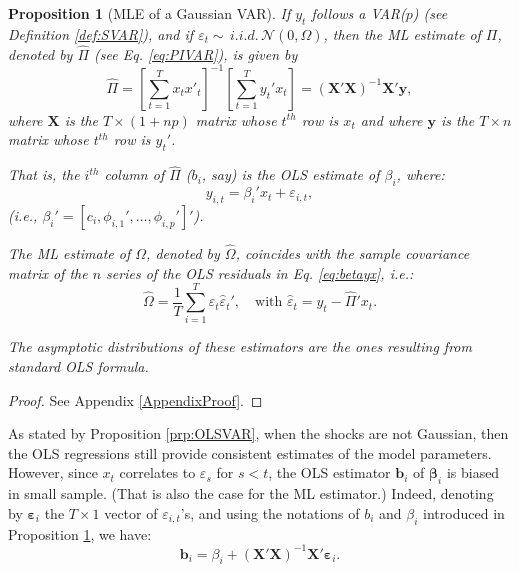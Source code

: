 \documentclass[
  12pt,
]{book}
\newtheorem{proposition}{Proposition}[chapter]
\theoremstyle{definition}
\theoremstyle{definition}
\theoremstyle{definition}
\theoremstyle{definition}
\theoremstyle{remark}
\begin{document}
\begin{proposition}[MLE of a Gaussian VAR]
\protect\hypertarget{prp:estimVARGaussian}{}\label{prp:estimVARGaussian}If \(y_t\) follows a VAR(\(p\)) (see Definition \ref{def:SVAR}), and if \(\varepsilon_t \sim \,i.i.d.\,\mathcal{N}(0,\Omega)\), then the ML estimate of \(\Pi\), denoted by \(\hat{\Pi}\) (see Eq. \eqref{eq:PIVAR}), is given by
\begin{equation}
\hat{\Pi}=\left[\sum_{t=1}^{T}x_{t}x'_{t}\right]^{-1}\left[\sum_{t=1}^{T}y_{t}'x_{t}\right]= (\mathbf{X}'\mathbf{X})^{-1}\mathbf{X}'\mathbf{y},
\label{eq:Pi}
\end{equation}
where \(\mathbf{X}\) is the \(T \times (1+np)\) matrix whose \(t^{th}\) row is \(x_t\) and where \(\mathbf{y}\) is the \(T \times n\) matrix whose \(t^{th}\) row is \(y_{t}'\).

That is, the \(i^{th}\) column of \(\hat{\Pi}\) (\(b_i\), say) is the OLS estimate of \(\beta_i\), where:
\begin{equation}
y_{i,t} = \beta_i'x_t + \varepsilon_{i,t},
\label{eq:betayx}
\end{equation}
(i.e., \(\beta_i' = [c_i,\phi_{i,1}',\dots,\phi_{i,p}']'\)).

The ML estimate of \(\Omega\), denoted by \(\hat{\Omega}\), coincides with the sample covariance matrix of the \(n\) series of the OLS residuals in Eq. \eqref{eq:betayx}, i.e.:
\begin{equation}
\hat{\Omega} = \frac{1}{T} \sum_{i=1}^T \hat{\varepsilon}_t\hat{\varepsilon}_t',\quad\mbox{with } \hat{\varepsilon}_t= y_t - \hat{\Pi}'x_t.
\end{equation}

The asymptotic distributions of these estimators are the ones resulting from standard OLS formula.
\end{proposition}

\begin{proof}
See Appendix \ref{AppendixProof}.
\end{proof}

As stated by Proposition \ref{prp:OLSVAR}, when the shocks are not Gaussian, then the OLS regressions still provide consistent estimates of the model parameters. However, since \(x_t\) correlates to \(\varepsilon_s\) for \(s<t\), the OLS estimator \(\mathbf{b}_i\) of \(\boldsymbol\beta_i\) is biased in small sample. (That is also the case for the ML estimator.) Indeed, denoting by \(\boldsymbol\varepsilon_i\) the \(T \times 1\) vector of \(\varepsilon_{i,t}\)'s, and using the notations of \(b_i\) and \(\beta_i\) introduced in Proposition \ref{prp:estimVARGaussian}, we have:
\begin{equation}
\mathbf{b}_i = \beta_i + (\mathbf{X}'\mathbf{X})^{-1}\mathbf{X}'\boldsymbol\varepsilon_i.
\label{eq:olsar1}
\end{equation}
\end{document}
